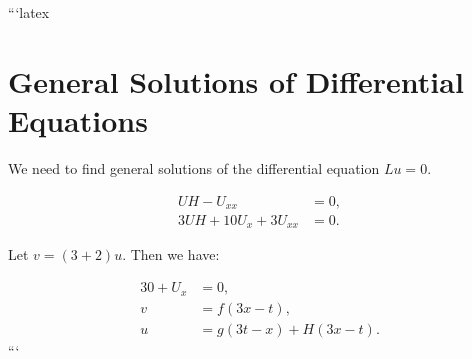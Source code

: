 ```latex
\section*{General Solutions of Differential Equations}

We need to find general solutions of the differential equation \( Lu = 0 \).

\begin{align}
    UH - U_{xx} &= 0, \\
    3UH + 10U_x + 3U_{xx} &= 0.
\end{align}

Let \( v = (3 + 2)u \). Then we have:

\begin{align}
    30 + U_x &= 0, \\
    v &= f(3x - t), \\
    u &= g(3t - x) + H(3x - t).
\end{align}
```
